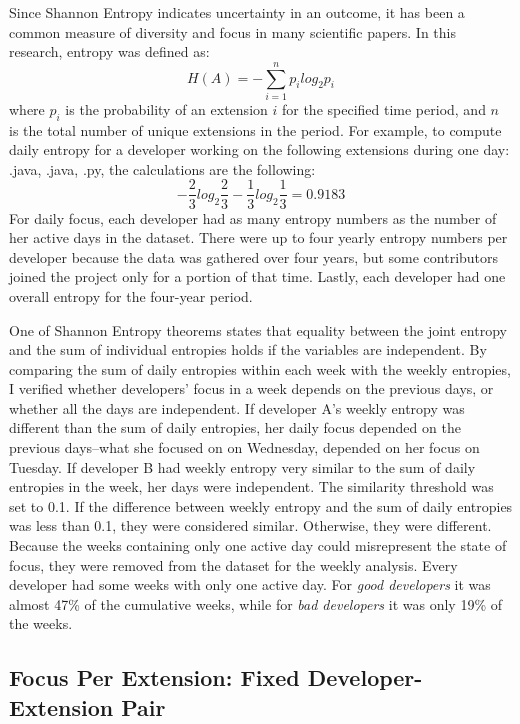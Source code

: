 Since Shannon Entropy indicates uncertainty in an outcome, it has been a common measure of diversity and focus in many scientific papers\parencite{posnett,Vasilescu:2016:SLM}. In this research, entropy was defined as:
\[H(A) = -\sum_{i=1}^{n} p_i log_2 p_i\]
where \(p_i\) is the probability of an extension \(i\) for the specified time period, and \(n\) is the total number of unique extensions in the period. For example, to compute daily entropy for a developer working on the following extensions during one day: .java, .java, .py, the calculations are the following:
\[-\frac{2}{3} log_2 \frac{2}{3} - \frac{1}{3} log_2 \frac{1}{3} = 0.9183\]
For daily focus, each developer had as many entropy numbers as the number of her active days in the dataset. There were up to four yearly entropy numbers per developer because the data was gathered over four years, but some contributors joined the project only for a portion of that time. Lastly, each developer had one overall entropy for the four-year period. \par

One of Shannon Entropy theorems states that equality between the joint entropy and the sum of individual entropies holds if the variables are independent\parencite{entropy}. By comparing the sum of daily entropies within each week with the weekly entropies, I verified whether developers’ focus in a week depends on the previous days, or whether all the days are independent. If developer A’s weekly entropy was different than the sum of daily entropies, her daily focus depended on the previous days–what she focused on on Wednesday, depended on her focus on Tuesday. If developer B had weekly entropy very similar to the sum of daily entropies in the week, her days were independent. The similarity threshold was set to 0.1. If the difference between weekly entropy and the sum of daily entropies was less than 0.1, they were considered similar. Otherwise, they were different. Because the weeks containing only one active day could misrepresent the state of focus, they were removed from the dataset for the weekly analysis. Every developer had some weeks with only one active day. For \textit{good developers} it was almost 47\% of the cumulative weeks, while for \textit{bad developers} it was only 19\% of the weeks.

\subsection{Focus Per Extension: Fixed Developer-Extension Pair}

